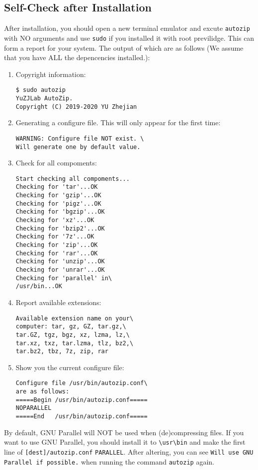 \documentclass[journal,twocolumn]{IEEEtran}
\begin{document}
\subsection{Self-Check after Installation}
After installation, you should open a new terminal emulator and excute \verb|autozip| with NO arguments and use \verb|sudo| if you installed it with root previlidge. This can form a report for your system. The output of which are as follows (We assume that you have ALL the depencencies installed.):
\begin{enumerate}
\item Copyright information:
\begin{verbatim}
$ sudo autozip
YuZJLab AutoZip.
Copyright (C) 2019-2020 YU Zhejian
\end{verbatim}
\item Generating a configure file. This will only appear for the first time:
\begin{verbatim}
WARNING: Configure file NOT exist. \
Will generate one by default value.
\end{verbatim}
\item Check for all compoments:
\begin{verbatim}
Start checking all compoments...
Checking for 'tar'...OK
Checking for 'gzip'...OK
Checking for 'pigz'...OK
Checking for 'bgzip'...OK
Checking for 'xz'...OK
Checking for 'bzip2'...OK
Checking for '7z'...OK
Checking for 'zip'...OK
Checking for 'rar'...OK
Checking for 'unzip'...OK
Checking for 'unrar'...OK
Checking for 'parallel' in\
/usr/bin...OK
\end{verbatim}
\item Report available extensions:
\begin{verbatim}
Available extension name on your\
computer: tar, gz, GZ, tar.gz,\
tar.GZ, tgz, bgz, xz, lzma, lz,\
tar.xz, txz, tar.lzma, tlz, bz2,\
tar.bz2, tbz, 7z, zip, rar
\end{verbatim}
\item Show you the current configure file:
\begin{verbatim}
Configure file /usr/bin/autozip.conf\
are as follows:
=====Begin /usr/bin/autozip.conf=====
NOPARALLEL
=====End   /usr/bin/autozip.conf=====
\end{verbatim}
\end{enumerate}
By default, GNU Parallel will NOT be used when (de)compressing files. If you want to use GNU Parallel, you should install it to \verb|\usr\bin| and make the first line of \verb|[dest]/autozip.conf| \verb|PARALLEL|. After altering, you can see \verb|Will use GNU Parallel if possible.| when running the command \verb|autozip| again.
\end{document}
